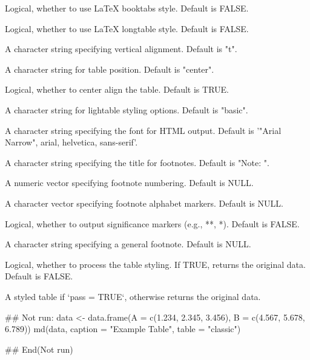 \documentclass[a4paper]{book}
\begin{document}
\begin{Arguments}
\begin{ldescription}
\item[\code{booktabs}] Logical, whether to use LaTeX booktabs style. Default is FALSE.

\item[\code{longtable}] Logical, whether to use LaTeX longtable style. Default is FALSE.

\item[\code{valign}] A character string specifying vertical alignment. Default is "t".

\item[\code{position}] A character string for table position. Default is "center".

\item[\code{centering}] Logical, whether to center align the table. Default is TRUE.

\item[\code{lightable\_options}] A character string for lightable styling options. Default is "basic".

\item[\code{html\_font}] A character string specifying the font for HTML output. Default is '"Arial Narrow", arial, helvetica, sans-serif'.

\item[\code{general\_title}] A character string specifying the title for footnotes. Default is "Note: ".

\item[\code{number}] A numeric vector specifying footnote numbering. Default is NULL.

\item[\code{alphabet}] A character vector specifying footnote alphabet markers. Default is NULL.

\item[\code{catout}] Logical, whether to output significance markers (e.g., **, *). Default is FALSE.

\item[\code{general}] A character string specifying a general footnote. Default is NULL.

\item[\code{pass}] Logical, whether to process the table styling. If TRUE, returns the original data. Default is FALSE.
\end{ldescription}
\end{Arguments}
%
\begin{Value}
A styled table if `pass = TRUE`, otherwise returns the original data.
\end{Value}
%
\begin{Examples}
\begin{ExampleCode}
\#\# Not run: 
  data <- data.frame(A = c(1.234, 2.345, 3.456), B = c(4.567, 5.678, 6.789))
  md(data, caption = "Example Table", table = "classic")

## End(Not run)
\end{ExampleCode}
\end{Examples}
\end{document}
